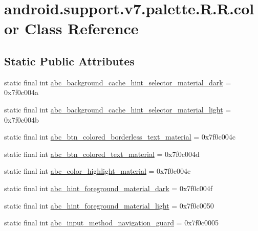 \hypertarget{classandroid_1_1support_1_1v7_1_1palette_1_1_r_1_1color}{
\section{android.support.v7.palette.R.R.color Class Reference}
\label{classandroid_1_1support_1_1v7_1_1palette_1_1_r_1_1color}
}
\subsection*{Static Public Attributes}
\begin{CompactItemize}
\item 
static final int \hyperlink{classandroid_1_1support_1_1v7_1_1palette_1_1_r_1_1color_bccfe5d8530188090c0a37adaf630d8b}{abc\_\-background\_\-cache\_\-hint\_\-selector\_\-material\_\-dark} = 0x7f0c004a
\item 
static final int \hyperlink{classandroid_1_1support_1_1v7_1_1palette_1_1_r_1_1color_fab467c62ba7c1a200fdc5da0f6ab208}{abc\_\-background\_\-cache\_\-hint\_\-selector\_\-material\_\-light} = 0x7f0c004b
\item 
static final int \hyperlink{classandroid_1_1support_1_1v7_1_1palette_1_1_r_1_1color_3618ec503fcfdaa06de744f0085f0882}{abc\_\-btn\_\-colored\_\-borderless\_\-text\_\-material} = 0x7f0c004c
\item 
static final int \hyperlink{classandroid_1_1support_1_1v7_1_1palette_1_1_r_1_1color_2df4f1ba5df2d6ad02a3900651cd9c2d}{abc\_\-btn\_\-colored\_\-text\_\-material} = 0x7f0c004d
\item 
static final int \hyperlink{classandroid_1_1support_1_1v7_1_1palette_1_1_r_1_1color_7285c4dcaab426ddcf4792a14ceefdb6}{abc\_\-color\_\-highlight\_\-material} = 0x7f0c004e
\item 
static final int \hyperlink{classandroid_1_1support_1_1v7_1_1palette_1_1_r_1_1color_414db25dc653eff0d4e6ebdc96db8cf0}{abc\_\-hint\_\-foreground\_\-material\_\-dark} = 0x7f0c004f
\item 
static final int \hyperlink{classandroid_1_1support_1_1v7_1_1palette_1_1_r_1_1color_4281a40f956e97dd16bdce7b6d92f38e}{abc\_\-hint\_\-foreground\_\-material\_\-light} = 0x7f0c0050
\item 
static final int \hyperlink{classandroid_1_1support_1_1v7_1_1palette_1_1_r_1_1color_c83d664c96edda37149e59d801e74436}{abc\_\-input\_\-method\_\-navigation\_\-guard} = 0x7f0c0005
\item 

\end{CompactItemize}
